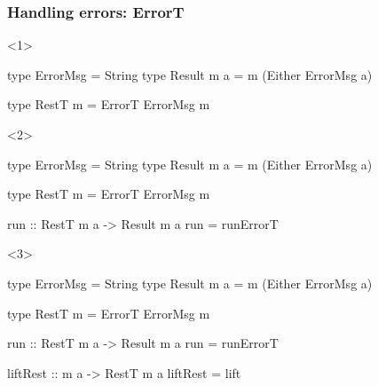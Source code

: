 \documentclass[20pt]{beamer}
\renewcommand{\(}[1]{\begin{columns}[#1]}
\renewcommand{\)}{\end{columns}}
\newcommand{\<}[1]{\begin{column}{#1\textwidth}}
\renewcommand{\>}{\end{column}}
\begin{document}
\begin{frame}[fragile]
\frametitle{Handling errors: ErrorT}
\vspace{-0.5cm}
\begin{overlayarea}{\paperwidth}{5cm}
\begin{onlyenv}<1>
  \begin{smallCode}
  type ErrorMsg   = String
  type Result m a = m (Either ErrorMsg a)

  type RestT m = ErrorT ErrorMsg m
  \end{smallCode}
\end{onlyenv}
\begin{onlyenv}<2>
  \begin{smallCode}
  type ErrorMsg   = String
  type Result m a = m (Either ErrorMsg a)

  type RestT m = ErrorT ErrorMsg m

  run :: RestT m a -> Result m a
  run = runErrorT
  \end{smallCode}
\end{onlyenv}
\begin{onlyenv}<3>
  \begin{smallCode}
  type ErrorMsg   = String
  type Result m a = m (Either ErrorMsg a)

  type RestT m = ErrorT ErrorMsg m

  run :: RestT m a -> Result m a
  run = runErrorT

  liftRest :: m a -> RestT m a
  liftRest = lift
  \end{smallCode}
\end{onlyenv}
\end{overlayarea}
  ~\\
  \begin{center}
  \end{center}
\end{frame}
\end{document}
